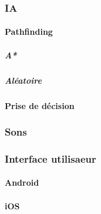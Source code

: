 	\subsubsection{IA}
	
		\hypertarget{IA}{}
		\label{IA}
		
		\paragraph{Pathfinding}
			\subparagraph{A*}
			\subparagraph{Aléatoire}
			\paragraph{Prise de décision}
			

	\subsubsection{Sons}
	
		\hypertarget{Sons}{}
		\label{Sons}
	
	\subsubsection{Interface utilisaeur}
		\paragraph{Android}
		\paragraph{iOS}
